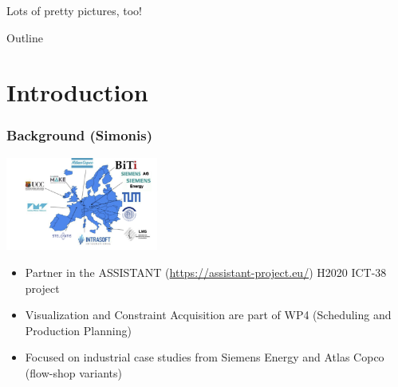 \begin{frame}{Lots of pretty pictures, too!}

\end{frame}

\begin{frame}{Outline}
    \tableofcontents
\end{frame}

\section{Introduction}

\begin{frame}
\frametitle{Background (Simonis)}
\includegraphics[width=5cm]{images/assistantpartners}
\begin{itemize}
\item Partner in the ASSISTANT (\url{https://assistant-project.eu/}) H2020 ICT-38 project
\item Visualization and Constraint Acquisition are part of WP4 (Scheduling and Production Planning)
\item Focused on industrial case studies from Siemens Energy and Atlas Copco (flow-shop variants)
\end{itemize}
\end{frame}

